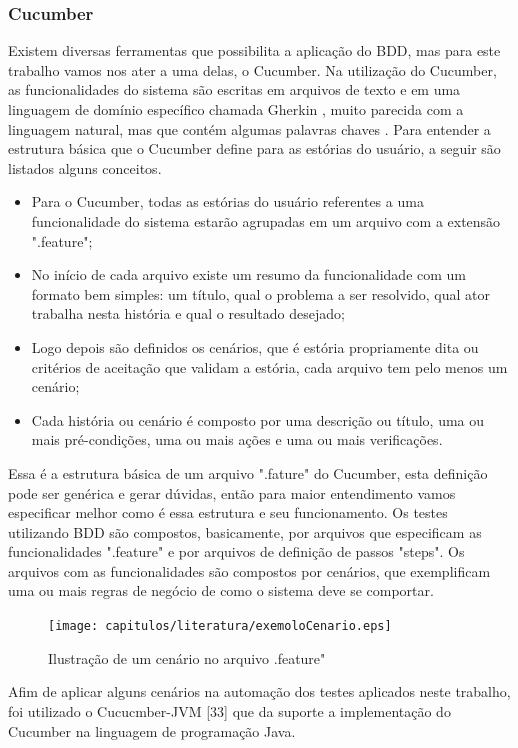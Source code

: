 \subsubsection{Cucumber}

Existem diversas ferramentas que possibilita a aplicação do BDD, mas para este trabalho vamos nos ater a uma delas, o Cucumber. Na utilização do Cucumber, as funcionalidades do sistema são escritas em arquivos de texto e em uma linguagem de domínio específico chamada Gherkin \cite{gherkin}, muito parecida com a linguagem natural, mas que contém algumas palavras chaves \cite{Cucumber}.  Para entender a estrutura básica que o Cucumber define para as estórias do usuário, a seguir são listados alguns conceitos.

\begin{itemize}

	\item Para o Cucumber, todas as  estórias do usuário referentes a uma funcionalidade do sistema estarão agrupadas em um arquivo com a extensão ".feature";
	\item No início de cada arquivo existe um resumo da funcionalidade com um formato bem simples: um título, qual o problema a ser resolvido, qual ator trabalha nesta história e qual o resultado desejado;
	\item Logo depois são definidos os cenários, que é estória propriamente dita ou critérios de aceitação que validam a estória, cada arquivo tem pelo menos um cenário;
	\item Cada história ou cenário é composto por uma descrição ou título, uma ou mais pré-condições, uma ou mais ações e uma ou mais verificações.
\end{itemize}

Essa é a estrutura básica de um arquivo ".fature" do Cucumber, esta definição pode ser genérica e gerar dúvidas, então para maior entendimento vamos especificar melhor como é essa estrutura e seu funcionamento. Os testes utilizando BDD são compostos, basicamente, por arquivos que especificam as funcionalidades ".feature" e por arquivos de definição de passos "steps". Os arquivos com as funcionalidades são compostos por cenários, que exemplificam uma ou mais regras de negócio de como o sistema deve se comportar.

\begin{figure}[H]
	\centering
	\captionsetup{justification=centering,margin=2cm}
	\texttt{[image: capitulos/literatura/exemoloCenario.eps]}
	\caption{Ilustração de um cenário no arquivo .feature"}
	\label{fig:iceCreamConAntiPattern}
\end{figure}	

Afim de aplicar alguns cenários na automação dos testes aplicados neste trabalho, foi utilizado o Cucucmber-JVM [33] que da suporte a implementação do Cucumber na linguagem de programação Java.
